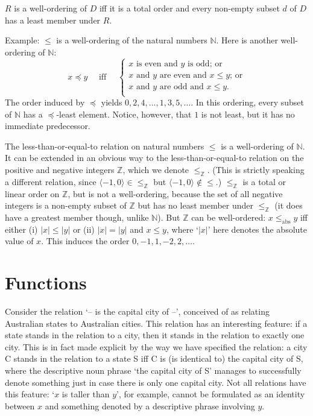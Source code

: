 \begin{definition}
  $R$ is a well-ordering of $D$ iff it is a total order and every non-empty subset $d$ of $D$ has a least member under $R$.
\end{definition} Example: $\leqslant$ is a well-ordering of the natural numbers $\mathbb{N}$. Here is another well-ordering of $\mathbb{N}$: \begin{equation}
  x \preccurlyeq y \quad\text{ iff }\quad \begin{cases}
    \text{$x$ is even and $y$ is odd; or}\\
    \text{$x$ and $y$ are even and $x\leqslant y$; or}\\
    \text{$x$ and $y$ are odd and $x\leqslant y$}.\\
  \end{cases}
\end{equation} The order induced by $\preccurlyeq$ yields $0, 2, 4, \ldots, 1, 3, 5, \ldots$. In this ordering, every subset of $\mathbb{N}$ has a $\preccurlyeq$-least element. Notice, however, that $1$ is not least, but it has no immediate predecessor. 

The less-than-or-equal-to relation on natural numbers $\leqslant$ is a well-ordering of $\mathbb{N}$. It can be extended in an obvious way to the less-than-or-equal-to relation on the positive and negative integers $\mathbb{Z}$, which we denote $\leqslant_{\mathbb{Z}}$. (This is strictly speaking a different relation, since $\langle -1,0\rangle\in \leqslant_{\mathbb{Z}}$ but $\langle -1,0\rangle\notin \leqslant$.) $\leqslant_{\mathbb{Z}}$ is a total or linear order on $\mathbb{Z}$, but is not a well-ordering, because the set of all negative integers is a non-empty subset of $\mathbb{Z}$ but has no least member under $\leqslant_{\mathbb{Z}}$ (it does have a greatest member though, unlike $\mathbb{N}$). But $\mathbb{Z}$ can be well-ordered: $x \leqslant_{\text{abs}} y$ iff either (i) $|x|\leqslant |y|$ or (ii) $|x|=|y|$ and $x\leqslant y$, where `$|x|$' here denotes the absolute value of $x$.  This induces the order $0,-1,1,-2,2,\ldots$.

\section{Functions}

Consider the relation `– is the capital city of –', conceived of as relating  Australian states to Australian cities. This relation has an interesting feature: if a state stands in the relation to a city, then it stands in the relation to exactly one city. This is in fact made explicit by the way we have specified the relation: a city C stands in the relation to a state S iff C is (is identical to) the capital city of S, where the descriptive noun phrase `the capital city of S' manages to successfully denote something just in case there is only one capital city. Not all relations have this feature: `$x$ is taller than $y$', for example, cannot be formulated as an identity between $x$ and something denoted by a descriptive phrase involving $y$.

